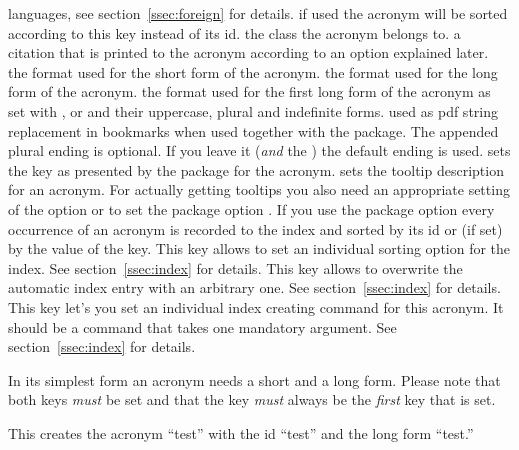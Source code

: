 \documentclass[load-preamble+]{cnltx-doc}
\begin{document}
\begin{options}
    languages, see section~\vref{ssec:foreign} for details.
    if used the acronym will be sorted according to this key instead of its
    \acs{id}.
    the class the acronym belongs to.
    a citation that is printed to the acronym according to an option explained
    later.
    the format used for the short form of the acronym.
    the format used for the long form of the acronym.
    the format used for the first long form of the acronym as set with ,
     or  and their uppercase, plural and indefinite forms.
    used as \acs{pdf} string replacement in bookmarks when used together with the
     package.  The appended plural ending is optional.  If you
   leave it (\emph{and} the \code{/}) the default ending is used.
    sets the  key as presented by the  package
    for the acronym.
    sets the tooltip description for an acronym.  For
    actually getting tooltips you also need an appropriate setting of the
     option or to set the package option
    .
    If you use the package option  every
    occurrence of an acronym is recorded to the index and sorted by its
    \acs{id} or (if set) by the value of the  key.  This key
    allows to set an individual sorting option for the index.  See
    section~\vref{ssec:index} for details.
    This key allows to overwrite the automatic index entry
    with an arbitrary one.  See section~\vref{ssec:index} for details.
    This key let's you set an individual index creating
    command for this acronym.  It should be a command that takes one mandatory
    argument.  See section~\vref{ssec:index} for details.
\end{options}

In its simplest form an acronym needs a short and a long form.  Please note
that both keys \emph{must} be set and that the  key \emph{must}
always be the \emph{first} key that is set.
\begin{sourcecode}
\end{sourcecode}
This creates the acronym ``\acs{test}'' with the \acs{id} ``test'' and the
long form ``\acl{test}.''
\end{document}
